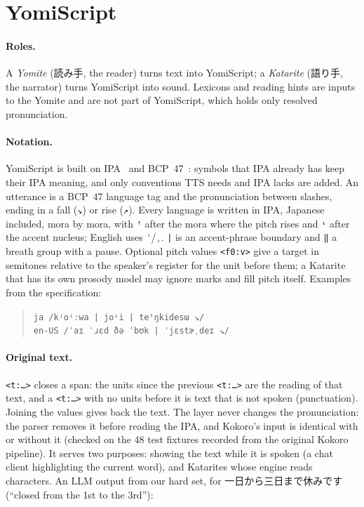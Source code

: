 \documentclass[11pt,a4paper]{article}
\newcommand{\ys}[1]{\mbox{\texttt{#1}}}
\begin{document}
\section{YomiScript}\label{sec:yomiscript}

\paragraph{Roles.} A \emph{Yomite} (読み手, the reader) turns text into YomiScript; a \emph{Katarite} (語り手, the
narrator) turns YomiScript into sound. Lexicons and reading hints are inputs to the Yomite and are not part of
YomiScript, which holds only resolved pronunciation.

\paragraph{Notation.} YomiScript is built on IPA~\citep{ipa1999handbook} and BCP~47~\citep{rfc5646}: symbols that IPA
already has keep their IPA meaning, and only conventions TTS needs and IPA lacks are added. An utterance is a BCP~47
language tag and the pronunciation between slashes, ending in a fall
(\ys{↘}) or rise (\ys{↗}). Every language is written in IPA, Japanese included, mora by mora, with \ys{ꜛ} after the
mora where the pitch rises and \ys{ꜜ} after the accent nucleus; English uses \ys{ˈ}/\ys{ˌ}. \ys{|} is an accent-phrase
boundary and \ys{‖} a breath group with a pause. Optional pitch values \ys{<f0:v>} give a target in semitones relative
to the speaker's register for the unit before them; a Katarite that has its own prosody model may ignore marks and fill
pitch itself. Examples from the specification:

\begin{quote}
\ys{ja /kʲoꜜːwa | joꜜi | teꜛŋkidesɯ ↘/}\\
\ys{en-US /ˈaɪ ˈɹɛd ðə ˈbʊk | ˈjɛstɚˌdeɪ ↘/}
\end{quote}

\paragraph{Original text.} \ys{<t:…>} closes a span: the units since the previous \ys{<t:…>} are the reading of that
text, and a \ys{<t:…>} with no units before it is text that is not spoken (punctuation). Joining the values gives back
the text. The layer never changes the pronunciation: the parser removes it before reading the IPA, and Kokoro's input
is identical with or without it (checked on the 48 test fixtures recorded from the original Kokoro pipeline). It serves two purposes:
showing the text while it is spoken (a chat client highlighting the current word), and Katarites whose engine reads
characters. An LLM output from our hard set, for 一日から三日まで休みです (``closed from the 1st to the 3rd''):
\end{document}

